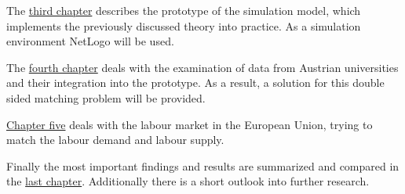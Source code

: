The \hyperref[prototype]{third chapter} describes the prototype of the simulation model, which implements the previously discussed theory into practice. 
As a simulation environment NetLogo will be used.

The \hyperref[evaluation_students]{fourth chapter} deals with the examination of data from Austrian universities and their integration into the prototype. 
As a result, a solution for this double sided matching problem will be provided.

\hyperref[evaluation_labor]{Chapter five} deals with the labour market in the European Union, trying to match the labour demand and labour supply. 

Finally the most important findings and results are summarized and compared in the \hyperref[summary]{last chapter}.
Additionally there is a short outlook into further research.